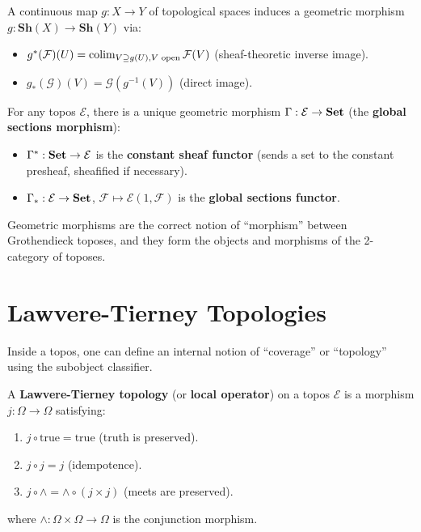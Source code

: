 \begin{example}
A continuous map $g: X \to Y$ of topological spaces induces a geometric morphism $g: \mathbf{Sh}(X) \to \mathbf{Sh}(Y)$ via:
\begin{itemize}
  \item $g^*(\mathcal{F})(U) = \operatorname{colim}_{V \supseteq g(U), V \text{ open}} \mathcal{F}(V)$ (sheaf-theoretic inverse image).
  \item $g_*(\mathcal{G})(V) = \mathcal{G}(g^{-1}(V))$ (direct image).
\end{itemize}
\end{example}

\begin{example}
For any topos $\mathcal{E}$, there is a unique geometric morphism $\Gamma: \mathcal{E} \to \mathbf{Set}$ (the \textbf{global sections morphism}):
\begin{itemize}
  \item $\Gamma^*: \mathbf{Set} \to \mathcal{E}$ is the \textbf{constant sheaf functor} (sends a set to the constant presheaf, sheafified if necessary).
  \item $\Gamma_*: \mathcal{E} \to \mathbf{Set}$, $\mathcal{F} \mapsto \mathcal{E}(1, \mathcal{F})$ is the \textbf{global sections functor}.
\end{itemize}
\end{example}

Geometric morphisms are the correct notion of ``morphism'' between Grothendieck toposes, and they form the objects and morphisms of the 2-category of toposes.

\section{Lawvere-Tierney Topologies}

Inside a topos, one can define an internal notion of ``coverage'' or ``topology'' using the subobject classifier.

\begin{definition}
A \textbf{Lawvere-Tierney topology} (or \textbf{local operator}) on a topos $\mathcal{E}$ is a morphism $j: \Omega \to \Omega$ satisfying:
\begin{enumerate}
  \item $j \circ \mathrm{true} = \mathrm{true}$ (truth is preserved).
  \item $j \circ j = j$ (idempotence).
  \item $j \circ \wedge = \wedge \circ (j \times j)$ (meets are preserved).
\end{enumerate}
where $\wedge: \Omega \times \Omega \to \Omega$ is the conjunction morphism.
\end{definition}

